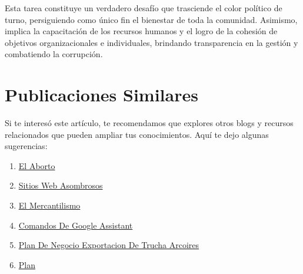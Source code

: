 \documentclass[
  jou,
  floatsintext,
  longtable,
  a4paper,
  nolmodern,
  notxfonts,
  notimes,
  colorlinks=true,linkcolor=blue,citecolor=blue,urlcolor=blue]{apa7}
\providecommand{\tightlist}{%
  \setlength{\itemsep}{0pt}\setlength{\parskip}{0pt}}
\begin{document}
Esta tarea constituye un verdadero desafío que trasciende el color
político de turno, persiguiendo como único fin el bienestar de toda la
comunidad. Asimismo, implica la capacitación de los recursos humanos y
el logro de la cohesión de objetivos organizacionales e individuales,
brindando transparencia en la gestión y combatiendo la corrupción.

\section{Publicaciones Similares}\label{publicaciones-similares}

Si te interesó este artículo, te recomendamos que explores otros blogs y
recursos relacionados que pueden ampliar tus conocimientos. Aquí te dejo
algunas sugerencias:

\begin{enumerate}
\def\labelenumi{\arabic{enumi}.}
\tightlist
\item
  \href{https://achalmaedison.netlify.app/blog/posts/2015-05-14-el-aborto/index.pdf}{}
  \href{https://achalmaedison.netlify.app/blog/posts/2015-05-14-el-aborto}{El
  Aborto}
\item
  \href{https://achalmaedison.netlify.app/blog/posts/2017-04-23-sitios-web-asombrosos/index.pdf}{}
  \href{https://achalmaedison.netlify.app/blog/posts/2017-04-23-sitios-web-asombrosos}{Sitios
  Web Asombrosos}
\item
  \href{https://achalmaedison.netlify.app/blog/posts/2017-05-23-el-mercantilismo/index.pdf}{}
  \href{https://achalmaedison.netlify.app/blog/posts/2017-05-23-el-mercantilismo}{El
  Mercantilismo}
\item
  \href{https://achalmaedison.netlify.app/blog/posts/2020-05-23-comandos-de-google-assistant/index.pdf}{}
  \href{https://achalmaedison.netlify.app/blog/posts/2020-05-23-comandos-de-google-assistant}{Comandos
  De Google Assistant}
\item
  \href{https://achalmaedison.netlify.app/blog/posts/2020-09-15-plan-de-negocio-exportacion-de-trucha-arcoires/index.pdf}{}
  \href{https://achalmaedison.netlify.app/blog/posts/2020-09-15-plan-de-negocio-exportacion-de-trucha-arcoires}{Plan
  De Negocio Exportacion De Trucha Arcoires}
\item
  \href{https://achalmaedison.netlify.app/blog/posts/2021-07-13-plan-de-negocio-exportacion-de-tuna/index.pdf}{}
  \href{https://achalmaedison.netlify.app/blog/posts/2021-07-13-plan-de-negocio-exportacion-de-tuna}{Plan
}
\end{enumerate}
\end{document}
